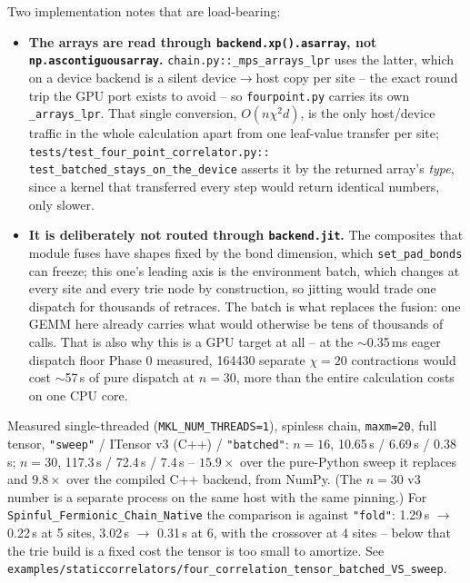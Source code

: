 \documentclass[11pt]{article}
\begin{document}
Two implementation notes that are load-bearing:

\begin{itemize}
\item \textbf{The arrays are read through \texttt{backend.xp().asarray}, not
  \texttt{np.ascontiguousarray}.} \texttt{chain.py::\_mps\_arrays\_lpr} uses
  the latter, which on a device backend is a silent device$\to$host copy per
  site -- the exact round trip the GPU port exists to avoid -- so
  \texttt{fourpoint.py} carries its own \texttt{\_arrays\_lpr}. That single
  conversion, $O(n\chi^2 d)$, is the only host/device traffic in the whole
  calculation apart from one leaf-value transfer per site;
  \texttt{tests/test\_four\_point\_correlator.py::}
  \texttt{test\_batched\_stays\_on\_the\_device} asserts it by the returned
  array's \emph{type}, since a kernel that transferred every step would
  return identical numbers, only slower.
\item \textbf{It is deliberately not routed through \texttt{backend.jit}.}
  The composites that module fuses have shapes fixed by the bond dimension,
  which \texttt{set\_pad\_bonds} can freeze; this one's leading axis is the
  environment batch, which changes at every site and every trie node by
  construction, so jitting would trade one dispatch for thousands of
  retraces. The batch is what replaces the fusion: one GEMM here already
  carries what would otherwise be tens of thousands of calls. That is also
  why this is a GPU target at all -- at the $\sim$0.35\,ms eager dispatch
  floor Phase 0 measured, 164430 separate $\chi=20$ contractions would cost
  $\sim$57\,s of pure dispatch at $n=30$, more than the entire calculation
  costs on one CPU core.
\end{itemize}

Measured single-threaded (\texttt{MKL\_NUM\_THREADS=1}), spinless chain,
\texttt{maxm=20}, full tensor, \texttt{"sweep"} / ITensor v3 (C++) /
\texttt{"batched"}: $n=16$, 10.65\,s / 6.69\,s / 0.38\,s; $n=30$, 117.3\,s /
72.4\,s / 7.4\,s -- $15.9\times$ over the pure-Python sweep it replaces and
$9.8\times$ over the compiled C++ backend, from NumPy. (The $n=30$ v3 number
is a separate process on the same host with the same pinning.) For
\texttt{Spinful\_Fermionic\_Chain\_Native} the comparison is against
\texttt{"fold"}: 1.29\,s $\to$ 0.22\,s at 5 sites, 3.02\,s $\to$ 0.31\,s at
6, with the crossover at 4 sites -- below that the trie build is a fixed cost
the tensor is too small to amortize. See
\texttt{examples/staticcorrelators/four\_correlation\_tensor\_batched\_VS\_sweep}.
\end{document}

